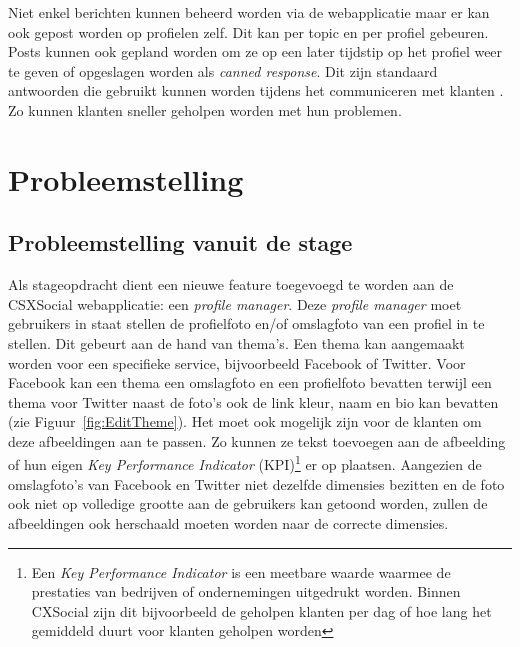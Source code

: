 Niet enkel berichten kunnen beheerd worden via de webapplicatie maar er kan ook gepost worden op profielen zelf. Dit kan per topic en per profiel gebeuren. Posts kunnen ook gepland worden om ze op een later tijdstip op het profiel weer te geven  of opgeslagen worden als \textit{canned response}. Dit zijn standaard antwoorden die gebruikt kunnen worden tijdens het communiceren met klanten \cite{EngagorApp}. Zo kunnen klanten sneller geholpen worden met hun problemen.
 
\chapter{Probleemstelling}
\vspace{-3cm}
\section{\textbf{Probleemstelling vanuit de stage}} \label{BeschrijvingStageOpdracht}

Als stageopdracht dient een nieuwe feature toegevoegd te worden aan de CSXSocial webapplicatie: een \textit{profile manager}. Deze \textit{profile manager} moet gebruikers in staat stellen de profielfoto en/of omslagfoto van een profiel in te stellen. Dit gebeurt aan de hand van thema's. Een thema kan aangemaakt worden voor een specifieke service, bijvoorbeeld Facebook of Twitter. Voor Facebook kan een thema een omslagfoto en een profielfoto bevatten terwijl een thema voor Twitter naast de foto's ook de link kleur, naam en bio kan bevatten (zie Figuur~\ref{fig:EditTheme}). Het moet ook mogelijk zijn voor de klanten om deze afbeeldingen aan te passen. Zo kunnen ze tekst toevoegen aan de afbeelding of hun eigen \textit{Key Performance Indicator} (KPI)\footnote{Een \textit{Key Performance Indicator} is een meetbare waarde waarmee de prestaties van bedrijven of ondernemingen uitgedrukt worden. Binnen CXSocial zijn dit bijvoorbeeld de geholpen klanten per dag of hoe lang het gemiddeld duurt voor klanten geholpen worden} er op plaatsen. Aangezien de omslagfoto's van Facebook en Twitter niet dezelfde dimensies bezitten en de foto ook niet op volledige grootte aan de gebruikers kan getoond worden, zullen de afbeeldingen ook herschaald moeten worden naar de correcte dimensies.

